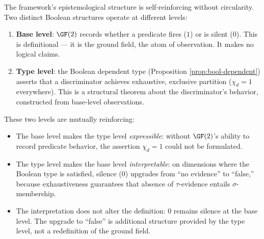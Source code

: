 \begin{proposition}
\label{prop:coherence}
The framework's epistemological structure is self-reinforcing
without circularity. Two distinct Boolean structures operate
at different levels:
\begin{enumerate}[label=(\roman*),nosep]
  \item \textbf{Base level}: $\GF(2)$ records whether a
    predicate fires ($1$) or is silent ($0$). This is
    definitional --- it is the ground field, the atom of
    observation. It makes no logical claims.
  \item \textbf{Type level}: the Boolean dependent type
    (Proposition \ref{prop:bool-dependent}) asserts that a
    discriminator achieves exhaustive, exclusive partition
    ($\chi_d = 1$ everywhere). This is a structural theorem
    about the discriminator's behavior, constructed from
    base-level observations.
\end{enumerate}
These two levels are mutually reinforcing:
\begin{itemize}[nosep]
  \item The base level makes the type level \emph{expressible}:
    without $\GF(2)$'s ability to record predicate behavior,
    the assertion $\chi_d = 1$ could not be formulated.
  \item The type level makes the base level \emph{interpretable}:
    on dimensions where the Boolean type is satisfied,
    silence ($0$) upgrades from ``no evidence'' to ``false,''
    because exhaustiveness guarantees that absence of
    $\tau$-evidence entails $\sigma$-membership.
  \item The interpretation does not alter the definition:
    $0$ remains silence at the base level. The upgrade to
    ``false'' is additional structure provided by the type
    level, not a redefinition of the ground field.
\end{itemize}
\end{proposition}


